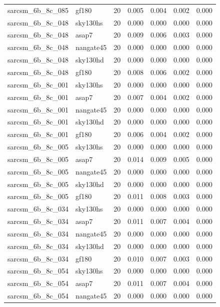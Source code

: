 \begin{tabular}{llrrrrr}
sarcsm\_6b\_8c\_085 & gf180 & 20 & 0.005 & 0.004 & 0.002 & 0.000 \\
sarcsm\_6b\_8c\_048 & sky130hs & 20 & 0.000 & 0.000 & 0.000 & 0.000 \\
sarcsm\_6b\_8c\_048 & asap7 & 20 & 0.009 & 0.006 & 0.003 & 0.000 \\
sarcsm\_6b\_8c\_048 & nangate45 & 20 & 0.000 & 0.000 & 0.000 & 0.000 \\
sarcsm\_6b\_8c\_048 & sky130hd & 20 & 0.000 & 0.000 & 0.000 & 0.000 \\
sarcsm\_6b\_8c\_048 & gf180 & 20 & 0.008 & 0.006 & 0.002 & 0.000 \\
sarcsm\_6b\_8c\_001 & sky130hs & 20 & 0.000 & 0.000 & 0.000 & 0.000 \\
sarcsm\_6b\_8c\_001 & asap7 & 20 & 0.007 & 0.004 & 0.002 & 0.000 \\
sarcsm\_6b\_8c\_001 & nangate45 & 20 & 0.000 & 0.000 & 0.000 & 0.000 \\
sarcsm\_6b\_8c\_001 & sky130hd & 20 & 0.000 & 0.000 & 0.000 & 0.000 \\
sarcsm\_6b\_8c\_001 & gf180 & 20 & 0.006 & 0.004 & 0.002 & 0.000 \\
sarcsm\_6b\_8c\_005 & sky130hs & 20 & 0.000 & 0.000 & 0.000 & 0.000 \\
sarcsm\_6b\_8c\_005 & asap7 & 20 & 0.014 & 0.009 & 0.005 & 0.000 \\
sarcsm\_6b\_8c\_005 & nangate45 & 20 & 0.000 & 0.000 & 0.000 & 0.000 \\
sarcsm\_6b\_8c\_005 & sky130hd & 20 & 0.000 & 0.000 & 0.000 & 0.000 \\
sarcsm\_6b\_8c\_005 & gf180 & 20 & 0.011 & 0.008 & 0.003 & 0.000 \\
sarcsm\_6b\_8c\_034 & sky130hs & 20 & 0.000 & 0.000 & 0.000 & 0.000 \\
sarcsm\_6b\_8c\_034 & asap7 & 20 & 0.011 & 0.007 & 0.004 & 0.000 \\
sarcsm\_6b\_8c\_034 & nangate45 & 20 & 0.000 & 0.000 & 0.000 & 0.000 \\
sarcsm\_6b\_8c\_034 & sky130hd & 20 & 0.000 & 0.000 & 0.000 & 0.000 \\
sarcsm\_6b\_8c\_034 & gf180 & 20 & 0.010 & 0.007 & 0.003 & 0.000 \\
sarcsm\_6b\_8c\_054 & sky130hs & 20 & 0.000 & 0.000 & 0.000 & 0.000 \\
sarcsm\_6b\_8c\_054 & asap7 & 20 & 0.011 & 0.007 & 0.004 & 0.000 \\
sarcsm\_6b\_8c\_054 & nangate45 & 20 & 0.000 & 0.000 & 0.000 & 0.000 \\

\end{tabular}
